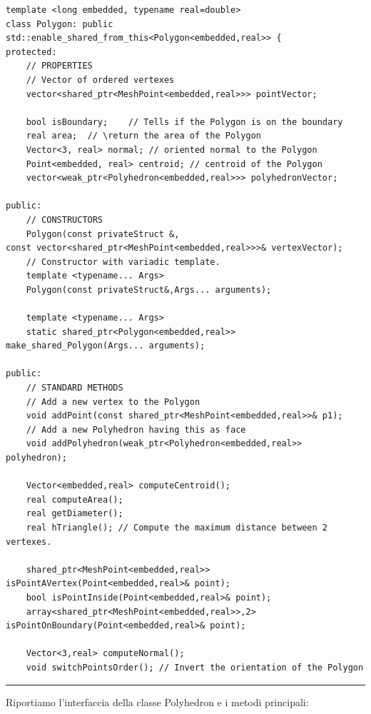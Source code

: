 \documentclass[oneside,12pt]{book}  %
\theoremstyle{plain}
\theoremstyle{definition}
\theoremstyle{remark}
\numberwithin{equation}{chapter} %
\begin{document}
\begin{verbatim}
template <long embedded, typename real=double>
class Polygon: public std::enable_shared_from_this<Polygon<embedded,real>> {
protected:
    // PROPERTIES
    // Vector of ordered vertexes
    vector<shared_ptr<MeshPoint<embedded,real>>> pointVector;
	
    bool isBoundary;	// Tells if the Polygon is on the boundary
    real area;	// \return the area of the Polygon
    Vector<3, real> normal;	// oriented normal to the Polygon
    Point<embedded, real> centroid;	// centroid of the Polygon
    vector<weak_ptr<Polyhedron<embedded,real>>> polyhedronVector;

public:
    // CONSTRUCTORS
    Polygon(const privateStruct &,
const vector<shared_ptr<MeshPoint<embedded,real>>>& vertexVector);
    // Constructor with variadic template.
    template <typename... Args>
    Polygon(const privateStruct&,Args... arguments);

    template <typename... Args>
    static shared_ptr<Polygon<embedded,real>> make_shared_Polygon(Args... arguments);

public:
    // STANDARD METHODS
    // Add a new vertex to the Polygon
    void addPoint(const shared_ptr<MeshPoint<embedded,real>>& p1); 
    // Add a new Polyhedron having this as face
    void addPolyhedron(weak_ptr<Polyhedron<embedded,real>> polyhedron);	
			
    Vector<embedded,real> computeCentroid();
    real computeArea();
    real getDiameter();
    real hTriangle(); // Compute the maximum distance between 2 vertexes.

    shared_ptr<MeshPoint<embedded,real>> isPointAVertex(Point<embedded,real>& point);	
    bool isPointInside(Point<embedded,real>& point);
    array<shared_ptr<MeshPoint<embedded,real>>,2> 
isPointOnBoundary(Point<embedded,real>& point);

    Vector<3,real> computeNormal();
    void switchPointsOrder(); // Invert the orientation of the Polygon

\end{verbatim}

\noindent\rule{14cm}{1pt}

Riportiamo l'interfaccia della classe Polyhedron e i metodi principali:
\end{document}
